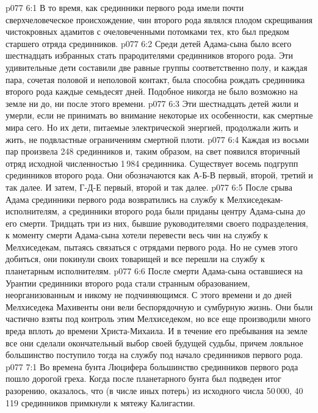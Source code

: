 \vs p077 6:1 В то время, как срединники первого рода имели почти сверхчеловеческое происхождение, чин второго рода являлся плодом скрещивания чистокровных адамитов с очеловеченными потомками тех, кто был предком старшего отряда срединников.
\vs p077 6:2 Среди детей Адама\hyp{}сына было всего шестнадцать избранных стать прародителями срединников второго рода. Эти удивительные дети составили две равные группы соответственно полу, и каждая пара, сочетая половой и неполовой контакт, была способна рождать срединника второго рода каждые семьдесят дней. Подобное никогда не было возможно на земле ни до, ни после этого времени.
\vs p077 6:3 Эти шестнадцать детей жили и умерли, если не принимать во внимание некоторые их особенности, как смертные мира сего. Но их дети, питаемые электрической энергией, продолжали жить и жить, не подвластные ограничениям смертной плоти.
\vs p077 6:4 Каждая из восьми пар произвела 248 срединников и, таким образом, на свет появился вторичный отряд исходной численностью 1\,984 срединника. Существует восемь подгрупп срединников второго рода. Они обозначаются как А\hyp{}Б\hyp{}В первый, второй, третий и так далее. И затем, Г\hyp{}Д\hyp{}Е первый, второй и так далее.
\vs p077 6:5 \pc После срыва Адама срединники первого рода возвратились на службу к Мелхиседекам\hyp{}исполнителям, а срединники второго рода были приданы центру Адама\hyp{}сына до его смерти. Тридцать три из них, бывшие руководителями своего подразделения, к моменту смерти Адама\hyp{}сына хотели перевести весь чин на службу к Мелхиседекам, пытаясь связаться с отрядами первого рода. Но не сумев этого добиться, они покинули своих товарищей и все перешли на службу к планетарным исполнителям.
\vs p077 6:6 После смерти Адама\hyp{}сына оставшиеся на Урантии срединники второго рода стали странным образованием, неорганизованным и никому не подчиняющимся. С этого времени и до дней Мелхиседека Махивенты они вели беспорядочную и сумбурную жизнь. Они были частично взяты под контроль этим Мелхиседеком, но все еще производили много вреда вплоть до времени Христа\hyp{}Михаила. И в течение его пребывания на земле все они сделали окончательный выбор своей будущей судьбы, причем лояльное большинство поступило тогда на службу под начало срединников первого рода.
\vs p077 7:1 Во времена бунта Люцифера большинство срединников первого рода пошло дорогой греха. Когда после планетарного бунта был подведен итог разорению, оказалось, что (в числе иных потерь) из исходного числа 50\,000, 40\,119 срединников примкнули к мятежу Калигастии.
